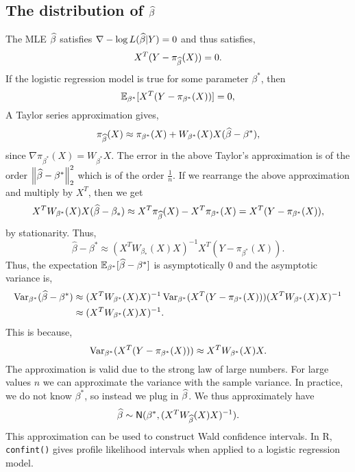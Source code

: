 \subsection{The distribution of $\widehat{\beta}$}
The MLE $\widehat{\beta}$ satisfies $\nabla -\log L(\widehat{\beta}|Y) = 0$ and thus satisfies,
\[X^T(Y-\pi_{\widehat{\beta}}(X)) = 0. \]
If the logistic regression model is true for some parameter $\beta^*$, then 
\[{\mathbb{E}}_{\beta^*}[X^T(Y-\pi_{\beta^*}(X))] =0, \]
 A Taylor series approximation gives,
\[\pi_{\widehat{\beta}}(X) \approx \pi_{\beta^*}(X) + W_{\beta^*}(X)X(\widehat{\beta}-\beta^*), \]
since $\nabla \pi_{\beta^*}(X) = W_{\beta^*}X$. The error in the above Taylor's approximation is of the order $\left\|\widehat{\beta}-\beta^*\right\|_2^2$ which is of the order $\frac{1}{n}$. If we rearrange the above approximation and multiply by $X^T$, then we get
\[X^TW_{\beta^*}(X)X(\widehat{\beta}-\beta_*) \approx X^T\pi_{\widehat{\beta}}(X)-X^T\pi_{\beta^*}(X) = X^T(Y-\pi_{\beta^*}(X)), \]
by stationarity. Thus,
\[\widehat{\beta}-\beta^* \approx (X^TW_{\beta_*}(X)X)^{-1}X^T(Y-\pi_{\beta^*}(X)). \]
Thus, the expectation ${\mathbb{E}}_{\beta^*}[\widehat{\beta}-\beta^*]$ is asymptotically 0 and the asymptotic variance is,
\begin{align*}
    \operatorname{Var}_{\beta^*}(\widehat{\beta}-\beta^*)& \approx (X^TW_{\beta^*}(X)X)^{-1}\operatorname{Var}_{\beta^*}(X^T(Y-\pi_{\beta^*}(X)))(X^TW_{\beta^*}(X)X)^{-1}\\
    & \approx (X^TW_{\beta^*}(X)X)^{-1}.
\end{align*}
This is because,
\[\operatorname{Var}_{\beta^*}(X^T(Y-\pi_{\beta^*}(X))) \approx X^TW_{\beta^*}(X)X.\]
The approximation is valid due to the strong law of large numbers. For large values $n$ we can approximate the variance with the sample variance. In practice, we do not  know $\beta^*$, so instead we plug in $\widehat{\beta}$. We thus approximately have
\[\widehat{\beta} \sim \mathsf{N}(\beta^*, (X^TW_{\widehat{\beta}}(X)X)^{-1}). \]
This approximation can be used to construct Wald confidence intervals. In R, \texttt{confint()} gives profile likelihood intervals when applied to a logistic regression model.

